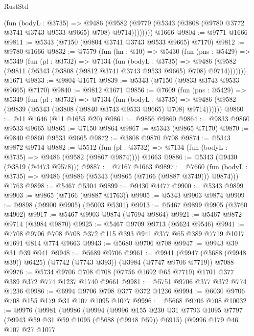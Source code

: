 \begin{lexlean}{RustStd}
\begin{coremodule}
            (fun (bodyL : @3735) =>
            @9486
              (@9582 (@9779 (@5343 (@3808 (@9780 @3772 @3741 @3743 @9533 @9665) @708) @9714))))))))
    @1666
@9804 := @9771 @1666
@9811 := @5343 (@7150 (@9804 @3741 @3743 @9533 @9665) @7170)
@9812 := @9780 @1666
@9832 := @7579
    (fun (hn : @10) =>
    @5430
      (fun (pns : @5429) =>
      @5349
        (fun (pl : @3732) =>
        @7134
          (fun (bodyL : @3735) =>
          @9486 (@9582 (@9811 (@5343 (@3808 (@9812 @3741 @3743 @9533 @9665) @708) @9714)))))))
    @1671
@9833 := @9804 @1671
@9839 := @5343 (@7150 (@9833 @3743 @9533 @9665) @7170)
@9840 := @9812 @1671
@9856 := @7609
    (fun (pns : @5429) =>
    @5349
      (fun (pl : @3732) =>
      @7134
        (fun (bodyL : @3735) =>
        @9486 (@9582 (@9839 (@5343 (@3808 (@9840 @3743 @9533 @9665) @708) @9714))))))
@9860 := @11 @1646 (@11 @1655 @20)
@9861 := @9856 @9860
@9864 := @9833 @9860 @9533 @9665
@9865 := @7150 @9864
@9867 := @5343 (@9865 @7170)
@9870 := @9840 @9860 @9533 @9665
@9872 := @3808 @9870 @708
@9874 := @5343 @9872 @9714
@9882 := @5512
    (fun (pl : @3732) => @7134 (fun (bodyL : @3735) => @9486 (@9582 (@9867 @9874))))
    @1663
@9886 := @5343 (@9430 (@3819 (@4473 @9578)))
@9887 := @7167 @1663
@9897 := @7660
    (fun (bodyL : @3735) => @9486 (@9886 (@5343 (@9865 (@7166 (@9887 @3749))) @9874)))
    @1763
@9898 := @5467 @5304
@9899 := @9430 @4477
@9900 := @5343 @9899
@9903 := @9865 (@7166 (@9887 @1763))
@9905 := @5343 @9903 @9874
@9909 := @9898 (@9900 @9905) (@5003 @5301)
@9913 := @5467 @9899 @9905 (@3760 @4902)
@9917 := @5467 @9903 @9874 (@7694 @9864)
@9921 := @5467 @9872 @9714 (@3984 @9870)
@9925 := @5467 @9709 @9713 (@5624 @9546)
@9941 := @7708 @9706 @708 @708 @372 @115 @393 @941 @377 @65 @389 @7719 @1017 @1691 @814 @774 @9663
@9943 := @5680 @9706 @708
@9947 := @9943 @39 @31 @39 @941
@9948 := @5689 @9706
@9961 := @9941
    (@9947 (@5688 (@9948 @39)) @6425)
    (@7742 (@7743 @393))
    (@3984 (@7747 @9706 @7719))
    @7088
@9976 := @5734 @9706 @708 @708 (@7756 @1692 @65 @7719) @1701 @377 @389 @372 @774 @1237 @1740 @9661
@9981 := @5751 @9706 @377 @372 @774 @1236
@9986 := @6994 @9706 @708 @377 @372 @1236
@9994 := @6030 @9706 @708 @155 @179 @31 @107 @1095 @1077
@9996 := @5668 @9706 @708
@10032 := @9976
    (@9981
      (@9986
        (@9994
          (@9996
            @155
            @230
            @31
            @7793
            @1095
            @7797
            (@9943 @59 @31 @59 @1095 (@5688 (@9948 @59)) @6915)
            (@9996
              @179
              @46
              @107
              @27
              @1077

\end{coremodule}
\end{lexlean}
